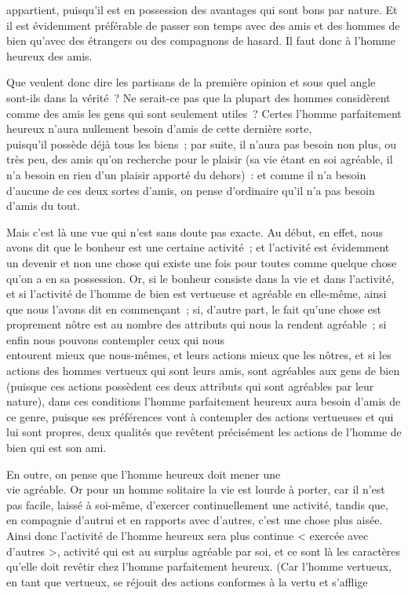\documentclass[french,twoside]{book} %
\begin{document}
appartient, puisqu’il est en possession des avantages qui sont bons par nature. Et il est évidemment préférable de passer son temps avec des amis et des hommes de bien qu’avec des étrangers ou des compagnons de hasard. Il faut donc à l’homme heureux des amis.\par
Que veulent donc dire les partisans de la première opinion et sous quel angle sont-ils dans la vérité ? Ne serait-ce pas que la plupart des hommes considèrent comme des amis les gens qui sont seulement utiles ? Certes l’homme parfaitement heureux n’aura nullement besoin d’amis de cette dernière sorte, \\
puisqu’il possède déjà tous les biens ; par suite, il n’aura pas besoin non plus, ou très peu, des amis qu’on recherche pour le plaisir (sa vie étant en soi agréable, il n’a besoin en rien d’un plaisir apporté du dehors) : et comme il n’a besoin d’aucune de ces deux sortes d’amis, on pense d’ordinaire qu’il n’a pas besoin d’amis du tout.\par
Mais c’est là une vue qui n’est sans doute pas exacte. Au début, en effet, nous avons dit que le bonheur est une certaine activité ; et l’activité est évidemment un devenir et non une chose qui existe une fois pour toutes comme quelque chose \\
qu’on a en sa possession. Or, si le bonheur consiste dans la vie et dans l’activité, et si l’activité de l’homme de bien est vertueuse et agréable en elle-même, ainsi que nous l’avons dit en commençant ; si, d’autre part, le fait qu’une chose est proprement nôtre est au nombre des attributs qui nous la rendent agréable ; si enfin nous pouvons contempler ceux qui nous \\
entourent mieux que nous-mêmes, et leurs actions mieux que les nôtres, et si les actions des hommes vertueux qui sont leurs  amis, sont agréables aux gens de bien (puisque ces actions possèdent ces deux attributs qui sont agréables par leur nature), dans ces conditions l’homme parfaitement heureux aura besoin d’amis de ce genre, puisque ses préférences vont à contempler des actions vertueuses et qui lui sont propres, deux qualités que revêtent précisément les actions de l’homme de bien qui est son ami.\par
En outre, on pense que l’homme heureux doit mener une \\
vie agréable. Or pour un homme solitaire la vie est lourde à porter, car il n’est pas facile, laissé à soi-même, d’exercer continuellement une activité, tandis que, en compagnie d’autrui et en rapports avec d’autres, c’est une chose plus aisée. Ainsi donc l’activité de l’homme heureux sera plus continue < exercée avec d’autres >, activité qui est au surplus agréable par soi, et ce sont là les caractères qu’elle doit revêtir chez l’homme parfaitement heureux. (Car l’homme vertueux, en tant que vertueux, se réjouit des actions conformes à la vertu et s’afflige \\
\end{document}
